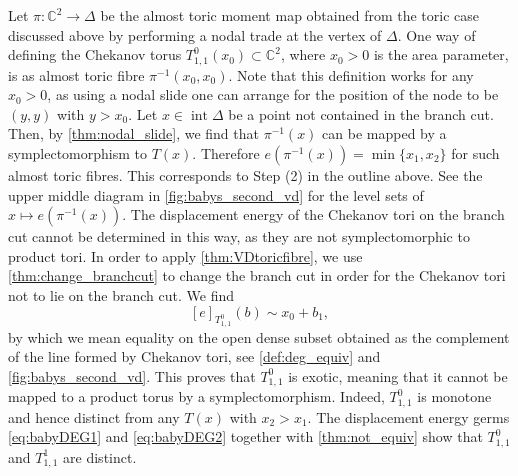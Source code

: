 \documentclass[AIF,Unicode,manuscript]{cedram}
\DeclareMathOperator{\interior}{int}
\begin{document}
Let $\pi \colon \mathbb{C}^2 \rightarrow \Delta$ be the almost toric moment map obtained from the toric case discussed above by performing a nodal trade at the vertex of $\Delta$.
One way of defining the Chekanov torus $T^0_{1,1}(x_0) \subset \mathbb{C}^2$, where $x_0 > 0$ is the area parameter, is as almost toric fibre $\pi^{-1}(x_0,x_0)$.
Note that this definition works for any $x_0 >0$, as using a nodal slide one can arrange for the position of the node to be $(y,y)$ with $y > x_0$.
Let $x \in \interior\Delta$ be a point not contained in the branch cut.
Then, by \cref{thm:nodal_slide}, we find that $\pi^{-1}(x)$ can be mapped by a symplectomorphism to $T(x)$.
Therefore $e(\pi^{-1}(x)) = \min \{x_1,x_2\}$ for such almost toric fibres.
This corresponds to Step (2) in the outline above.
See the upper middle diagram in \cref{fig:babys_second_vd} for the level sets of $x \mapsto e(\pi^{-1}(x))$.
The displacement energy of the Chekanov tori on the branch cut cannot be determined in this way, as they are not symplectomorphic to product tori.
In order to apply \cref{thm:VDtoricfibre}, we use \cref{thm:change_branchcut} to change the branch cut in order for the Chekanov tori not to lie on the branch cut.
We find
\begin{equation}
    \label{eq:babyDEG2}
    [e]_{T^0_{1,1}}(b) \sim x_0 + b_1,
\end{equation}
by which we mean equality on the open dense subset obtained as the complement of the line formed by Chekanov tori, see \cref{def:deg_equiv} and \cref{fig:babys_second_vd}.
This proves that $T^0_{1,1}$ is exotic, meaning that it cannot be mapped to a product torus by a symplectomorphism.
Indeed, $T^0_{1,1}$ is monotone and hence distinct from any $T(x)$ with $x_2 > x_1$.
The displacement energy germs \eqref{eq:babyDEG1} and \eqref{eq:babyDEG2} together with \cref{thm:not_equiv} show that $T^0_{1,1}$ and $T^1_{1,1}$ are distinct. 
\end{document}
